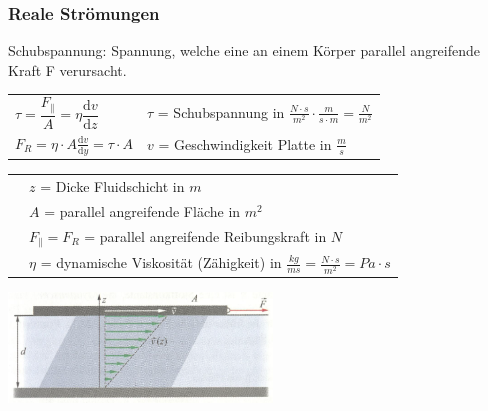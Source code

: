		\subsubsection{Reale Strömungen}
			\begin{minipage}{12cm}
				\begin{flushleft}
					Schubspannung: Spannung, welche eine an einem Körper parallel angreifende Kraft F verursacht.
				\end{flushleft}
				\renewcommand{\arraystretch}{2.5}
				\begin{tabular}{ p{4cm} | p{7cm}}
					$\tau = \dfrac{F_\parallel}{A} = \eta \dfrac{\mathrm{d}v}{\mathrm{d}z}$	&	$\tau$ = Schubspannung in $\frac{N \cdot s}{m^2} \cdot \frac{m}{s \cdot m} = \frac{N}{m^2}$\\
					$F_R = \eta \cdot A \frac{\mathrm{d}v}{\mathrm{d}y} = \tau \cdot A$ & $v$ = Geschwindigkeit Platte in $\frac{m}{s}$\\
				\end{tabular}
				\renewcommand{\arraystretch}{1.5}
				\begin{tabular}{ p{4cm} | p{10cm} }
					& $z$ = Dicke Fluidschicht in $m$\\
					& $A$ = parallel angreifende Fläche in $m^2$\\
					& $F_{\parallel} = F_R$ = parallel angreifende Reibungskraft in $N$\\
					& $\eta$ = dynamische Viskosität (Zähigkeit) in $\frac{kg}{ms} = \frac{N \cdot s}{m^2} = Pa \cdot s$\\
				\end{tabular} 
				\renewcommand{\arraystretch}{1}
			\end{minipage}
			\begin{minipage}{10cm}
				\vspace{-\ht\strutbox}\includegraphics[width=7cm]{./bilder/NewtonschesReibungsgesetz.png}
			\end{minipage}
			\newline
			\newline
			\newline
			\newline
